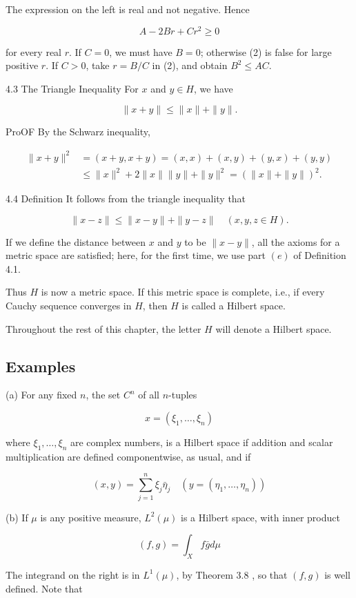 \documentclass[10pt]{article}
\begin{document}
The expression on the left is real and not negative. Hence

$$
A-2 B r+C r^{2} \geq 0
$$

for every real $r$. If $C=0$, we must have $B=0$; otherwise (2) is false for large positive $r$. If $C>0$, take $r=B / C$ in (2), and obtain $B^{2} \leq A C$.

4.3 The Triangle Inequality For $x$ and $y \in H$, we have

$$
\|x+y\| \leq\|x\|+\|y\| .
$$

ProOF By the Schwarz inequality,

$$
\begin{aligned}
\|x+y\|^{2} & =(x+y, x+y)=(x, x)+(x, y)+(y, x)+(y, y) \\
& \leq\|x\|^{2}+2\|x\|\|y\|+\|y\|^{2}=(\|x\|+\|y\|)^{2} .
\end{aligned}
$$

4.4 Definition It follows from the triangle inequality that

$$
\|x-z\| \leq\|x-y\|+\|y-z\| \quad(x, y, z \in H) .
$$

If we define the distance between $x$ and $y$ to be $\|x-y\|$, all the axioms for a metric space are satisfied; here, for the first time, we use part $(e)$ of Definition 4.1.

Thus $H$ is now a metric space. If this metric space is complete, i.e., if every Cauchy sequence converges in $H$, then $H$ is called a Hilbert space.

Throughout the rest of this chapter, the letter $H$ will denote a Hilbert space.

\subsection{Examples}
(a) For any fixed $n$, the set $C^{n}$ of all $n$-tuples

$$
x=\left(\xi_{1}, \ldots, \xi_{n}\right)
$$

where $\xi_{1}, \ldots, \xi_{n}$ are complex numbers, is a Hilbert space if addition and scalar multiplication are defined componentwise, as usual, and if

$$
(x, y)=\sum_{j=1}^{n} \xi_{j} \bar{\eta}_{j} \quad\left(y=\left(\eta_{1}, \ldots, \eta_{n}\right)\right)
$$

(b) If $\mu$ is any positive measure, $L^{2}(\mu)$ is a Hilbert space, with inner product

$$
(f, g)=\int_{X} f \bar{g} d \mu
$$

The integrand on the right is in $L^{1}(\mu)$, by Theorem 3.8 , so that $(f, g)$ is well defined. Note that
\end{document}
